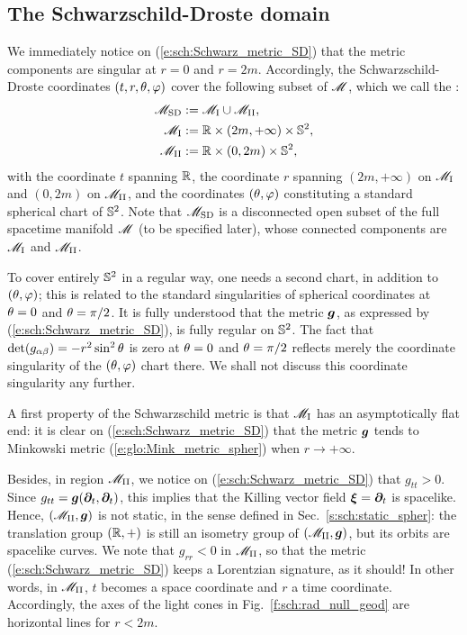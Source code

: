 \subsection{The Schwarzschild-Droste domain} \label{s:sch:SD_domain}

We immediately notice on (\ref{e:sch:Schwarz_metric_SD}) that the metric
components are singular at $r=0$ and $r=2m$. Accordingly, the Schwarzschild-Droste coordinates $(t,r,\theta,\varphi)$ cover the following subset of $\mathscr{M}$, which we call the
:
\begin{subequations}
\begin{align}
    \mathscr{M}_{\rm SD} & :=  \mathscr{M}_{\rm I} \cup \mathscr{M}_{\rm II} , \\
    \mathscr{M}_{\rm I} & :=  \mathbb{R}\times(2m,+\infty)\times\mathbb{S}^2 ,\\
    \mathscr{M}_{\rm II} & :=  \mathbb{R}\times(0,2m)\times\mathbb{S}^2 ,
\end{align}
\end{subequations}
with the coordinate $t$ spanning $\mathbb{R}$, the coordinate $r$ spanning $(2m,+\infty)$
on $\mathscr{M}_{\rm I}$ and $(0,2m)$ on $\mathscr{M}_{\rm II}$, and the coordinates $(\theta,\varphi)$
constituting a standard spherical chart of $\mathbb{S}^2$.
Note that $\mathscr{M}_{\rm SD}$ is a disconnected open subset of the full spacetime
manifold $\mathscr{M}$ (to be specified later), whose connected components are
$\mathscr{M}_{\rm I}$ and $\mathscr{M}_{\rm II}$.

\begin{remark}
To cover entirely $\mathbb{S}^2$ in a regular way, one needs a second chart, in
addition to $(\theta,\varphi)$; this is related to the standard singularities of
spherical coordinates at $\theta=0$ and $\theta=\pi/2$. It is fully understood
that the metric $\bm{g}$, as expressed by (\ref{e:sch:Schwarz_metric_SD}), is
fully regular on $\mathbb{S}^2$. The fact that $\det(g_{\alpha\beta}) = -r^2\sin^2\theta$ is zero
at $\theta=0$ and $\theta=\pi/2$ reflects merely the coordinate singularity
of the $(\theta,\varphi)$ chart there. We shall not discuss this coordinate singularity
any further.
\end{remark}

A first property of the Schwarzschild metric is that $\mathscr{M}_{\rm I}$ has an
asymptotically flat end: it is clear on (\ref{e:sch:Schwarz_metric_SD})
that the metric $\bm{g}$ tends to Minkowski metric (\ref{e:glo:Mink_metric_spher})
when $r\rightarrow +\infty$.

Besides, in region $\mathscr{M}_{\rm II}$, we notice on (\ref{e:sch:Schwarz_metric_SD})
that $g_{tt} > 0$. Since $g_{tt} = \bm{g}(\bm{\partial}_t,\bm{\partial}_t)$, this implies
that the Killing vector field $\bm{\xi} = \bm{\partial}_t$ is spacelike. Hence,
$(\mathscr{M}_{\rm II},\bm{g})$ is not static, in the sense defined in
Sec.~\ref{s:sch:static_spher}: the translation group $(\mathbb{R},+)$ is still an
isometry group of $(\mathscr{M}_{\rm II},\bm{g})$, but its orbits are spacelike curves.
We note that $g_{rr} < 0$ in $\mathscr{M}_{\rm II}$, so that the
metric (\ref{e:sch:Schwarz_metric_SD}) keeps a Lorentzian signature,
as it should!
In other words, in $\mathscr{M}_{\rm II}$, $t$ becomes a space coordinate and
$r$ a time coordinate. Accordingly, the axes of the light cones
in Fig.~\ref{f:sch:rad_null_geod} are horizontal lines for $r<2m$.

